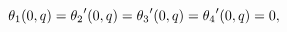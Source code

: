 \[\mathop{\theta_{1}\/}\nolimits\!\left(0,q\right)=\mathop{\theta_{2}\/}%
\nolimits'\!\left(0,q\right)=\mathop{\theta_{3}\/}\nolimits'\!\left(0,q\right)%
=\mathop{\theta_{4}\/}\nolimits'\!\left(0,q\right)=0,\]